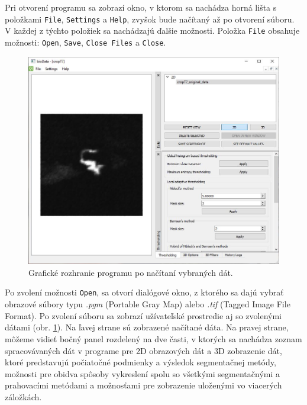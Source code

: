\documentclass[a4paper,11pt,oneside]{article}%
\begin{document}
Pri otvorení programu sa zobrazí okno, v ktorom sa nachádza horná lišta s položkami \texttt{File}, \texttt{Settings} a \texttt{Help}, zvyšok bude načítaný až po otvorení súboru. V každej z týchto položiek sa nachádzajú ďalšie možnosti. Položka \texttt{File} obsahuje možnosti: \texttt{Open}, \texttt{Save}, \texttt{Close Files} a \texttt{Close}.

\begin{figure}[H]
 \begin{center} 
 \includegraphics[scale=0.50]{pics/ui1.jpg}
\caption{Grafické rozhranie programu po načítaní vybraných dát.}
\label{fig:ui1}
\end{center} 
\end{figure}

Po zvolení možnosti \texttt{Open}, sa otvorí dialógové okno, z ktorého sa dajú vybrať obrazové súbory typu \textit{.pgm} (Portable Gray Map) alebo \textit{.tif} (Tagged Image File Format). Po zvolení súboru sa zobrazí užívateľské prostredie aj so zvolenými dátami (obr. \ref{fig:ui1}). Na ľavej strane sú zobrazené načítané dáta. Na pravej strane, môžeme vidieť bočný panel rozdelený na dve časti, v ktorých sa nachádza zoznam spracovávaných dát v programe pre 2D obrazových dát a 3D zobrazenie dát, ktoré predstavujú počiatočné podmienky a výsledok segmentačnej metódy, možnosti pre obidva spôsoby vykreslení spolu so všetkými  segmentačnými a prahovacími metódami a možnosťami pre zobrazenie uloženými vo viacerých záložkách. 
\end{document}
